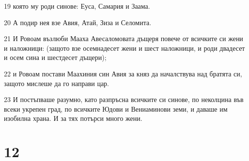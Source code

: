 \par 19 която му роди синове: Еуса, Самария и Заама.
\par 20 А подир нея взе Авия, Атай, Зиза и Селомита.
\par 21 И Ровоам възлюби Мааха Авесаломовата дъщеря повече от всичките си жени и наложници: (защото взе осемнадесет жени и шест наложници, и роди двадесет и осем сина и шестдесет дъщери);
\par 22 и Ровоам постави Маахиния син Авия за княз да началствува над братята си, защото мислеше да го направи цар.
\par 23 И постъпваше разумно, като разпръсна всичките си синове, по неколцина във всеки укрепен град, по всичките Юдови и Вениаминови земи, и даваше им изобилна храна. И за тях потърси много жени.

\chapter{12}

